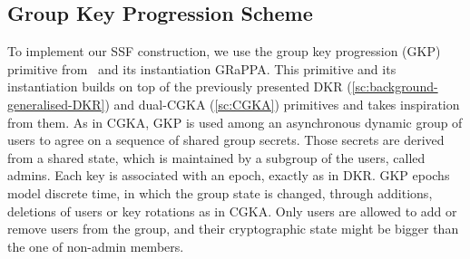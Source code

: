\subsection{Group Key Progression Scheme}\label{sc:gkp-scheme}

To implement our SSF construction, we use the group key 
progression (GKP) primitive from~\cite{GKP} and its
instantiation GRaPPA.
This primitive and its instantiation builds on top of the previously presented DKR
(\cref{sc:background-generalised-DKR}) and dual-CGKA (\cref{sc:CGKA}) primitives
and takes inspiration from them.
As in CGKA, GKP is used among an asynchronous dynamic group of users
to agree on a sequence of shared group secrets. Those secrets
are derived from a shared state, which is maintained by a
subgroup of the users, called admins. Each key is associated with
an epoch, exactly as in DKR. GKP epochs model
discrete time, in which the group state is changed, through
additions, deletions of users or key rotations as in CGKA.
Only users are allowed to add or remove users from the group,
and their cryptographic state might be bigger than the one of
non-admin members.

